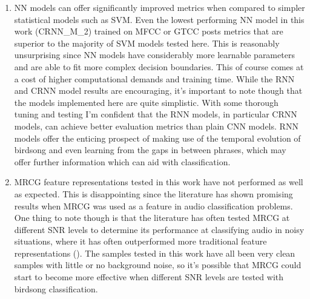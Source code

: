 \begin{enumerate}
  \item NN models can offer significantly improved metrics when compared to
    simpler statistical models such as SVM\@. Even the lowest performing NN
    model in this work (CRNN\_M\_2) trained on MFCC or GTCC posts metrics that
    are superior to the majority of SVM models tested here. This is reasonably
    unsurprising since NN models have considerably more learnable parameters and
    are able to fit more complex decision boundaries. This of course comes at a
    cost of higher computational demands and training time. While the RNN and
    CRNN model results are encouraging, it's important to note though that the
    models implemented here are quite simplistic. With some thorough tuning and
    testing I'm confident that the RNN models, in particular CRNN models, can
    achieve better evaluation metrics than plain CNN models. RNN models offer
    the enticing prospect of making use of the temporal evolution of birdsong
    and even learning from the gaps in between phrases, which may offer further
    information which can aid with classification.

  \item MRCG feature representations tested in this work have not performed as
    well as expected. This is disappointing since the literature has shown
    promising results when MRCG was used as a feature in audio classification
    problems. One thing to note though is that the literature has often tested
    MRCG at different SNR levels to determine its performance at classifying
    audio in noisy situations, where it has often outperformed more traditional
    feature representations (\cite{binti2020comparison,chen2014feature}). The
    samples tested in this work have all been very clean samples with little or
    no background noise, so it's possible that MRCG could start to become more
    effective when different SNR levels are tested with birdsong
    classification.

\end{enumerate}
